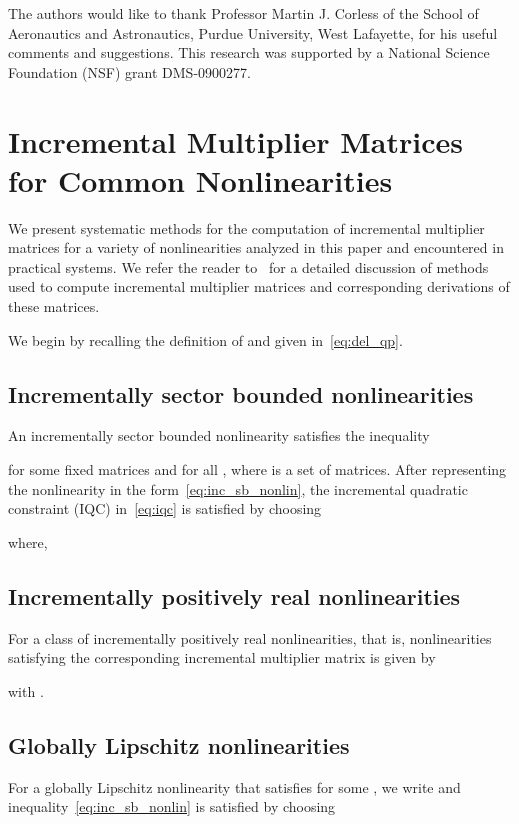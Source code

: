 \documentclass[times, doublespace]{rncauth}
\begin{document}
\acks
The authors would like to thank Professor Martin J. Corless of the School of Aeronautics and Astronautics, Purdue University, West Lafayette, for his useful comments and suggestions.
This research was supported by a National Science Foundation (NSF) grant DMS-0900277.
\vspace{1em}


\appendix
\section{Incremental Multiplier Matrices for Common Nonlinearities}\label{app}
We present systematic methods for the computation of incremental multiplier matrices for a variety of nonlinearities analyzed in this paper and encountered in practical systems. We refer the reader to~\cite[Section 6]{iqs_corless} for a detailed discussion of methods used to compute incremental multiplier matrices and corresponding derivations of these matrices.

We begin by recalling the definition of  and  given in~\eqref{eq:del_qp}.
\subsection{Incrementally sector bounded nonlinearities}
An incrementally sector bounded nonlinearity satisfies the inequality

for some fixed matrices  and for all , where  is a set of matrices.
After representing the nonlinearity in the form~\eqref{eq:inc_sb_nonlin}, the incremental quadratic constraint (IQC) in~\eqref{eq:iqc} is satisfied by choosing

where,


\subsection{Incrementally positively real nonlinearities}
For a class of incrementally positively real nonlinearities, that is, nonlinearities satisfying  the corresponding incremental multiplier matrix is given by

with .

\subsection{Globally Lipschitz nonlinearities}
For a globally Lipschitz nonlinearity that satisfies  for some , we write 
and inequality~\eqref{eq:inc_sb_nonlin} is satisfied by choosing
\end{document}
